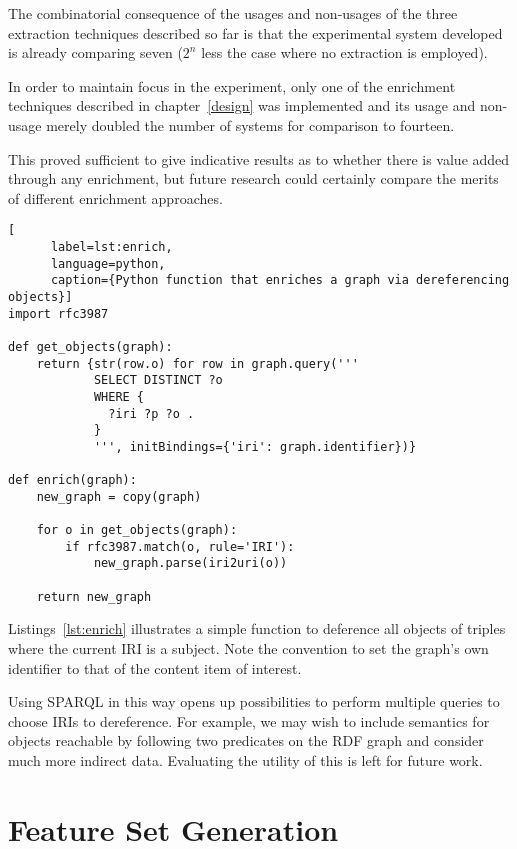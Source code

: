The combinatorial consequence of the usages and non-usages of the
three extraction techniques described so far is that the
experimental system developed is already comparing seven ($2^n$ less
the case where no extraction is employed).

In order to maintain focus in the experiment, only one of the
enrichment techniques described in chapter~\ref{design} was
implemented and its usage and non-usage merely doubled the
number of systems for comparison to fourteen.

This proved sufficient to give indicative results as to whether there
is value added through any enrichment, but future research could
certainly compare the merits of different enrichment approaches.

\begin{centering}
  \begin{lstlisting}[
      label=lst:enrich,
      language=python,
      caption={Python function that enriches a graph via dereferencing objects}]
import rfc3987
    
def get_objects(graph):
    return {str(row.o) for row in graph.query('''
            SELECT DISTINCT ?o
            WHERE {
              ?iri ?p ?o .
            }
            ''', initBindings={'iri': graph.identifier})}

def enrich(graph):
    new_graph = copy(graph)

    for o in get_objects(graph):
        if rfc3987.match(o, rule='IRI'):
            new_graph.parse(iri2uri(o))

    return new_graph
  \end{lstlisting}
\end{centering}

Listings~\ref{lst:enrich} illustrates a simple function to
deference all objects of triples where the current IRI is a subject.
Note the convention to set the graph's own identifier to that of
the content item of interest.

Using SPARQL in this way opens up possibilities to perform multiple
queries to choose IRIs to dereference. For example, we may wish to
include semantics for objects reachable by following two predicates
on the RDF graph and consider much more indirect data. Evaluating
the utility of this is left for future work.

\section{Feature Set Generation}

